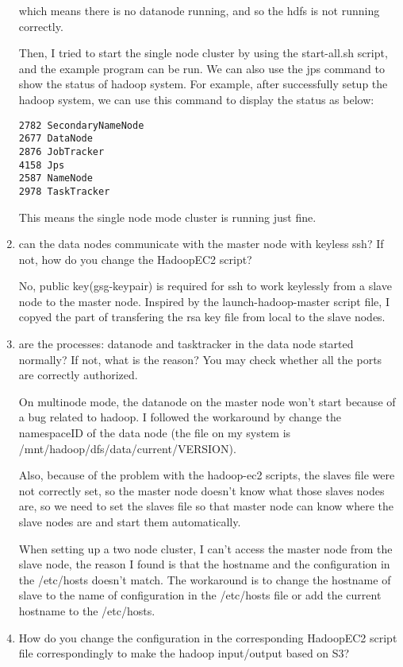 \documentclass{article}
\begin{document}
\begin{enumerate}
which means there is no datanode running, and so the hdfs is not 
running correctly.

Then, I tried to start the single node cluster by using the
start-all.sh script, and the example program can be run. 
We can also use the jps command to show the status of hadoop
system. For example, after successfully setup the hadoop system, we
can use this command to display the status as below: 
\begin{verbatim}
2782 SecondaryNameNode
2677 DataNode
2876 JobTracker
4158 Jps
2587 NameNode
2978 TaskTracker
\end{verbatim}
This means the single node mode cluster is running just fine.

\item can the data nodes communicate with the master node with keyless
ssh? If not, how do you change the HadoopEC2 script? 

No, public key(gsg-keypair) is required for ssh to work keylessly from
a slave node to the master node. Inspired by the launch-hadoop-master
script file, I copyed the part of transfering the rsa key file from
local to the slave nodes. 

\item are the processes: datanode and tasktracker in the data node
started normally? If not, what is the reason? You may check whether
all the ports are correctly authorized. 

On multinode mode, the datanode on the master node won't start because
of a bug related to hadoop. I followed the workaround by change the
namespaceID of the data node (the file on my system is \\
/mnt/hadoop/dfs/data/current/VERSION).

Also, because of the problem with the hadoop-ec2 scripts, the slaves file
were not correctly set, so the master node doesn't know what those slaves
nodes are, so we need to set the slaves file so that master node can know 
where the slave nodes are and start them automatically. 

When setting up a two node cluster, I can't access the master node
from the slave node, the reason I found is that the hostname and the
configuration in the /etc/hosts doesn't match. The workaround is to
change the hostname of slave to the name of configuration in the
/etc/hosts file or add the current hostname to the /etc/hosts. 

\item How do you change the configuration in the corresponding HadoopEC2 
script file correspondingly to make the hadoop input/output based on S3?


\end{enumerate}
\end{document}

